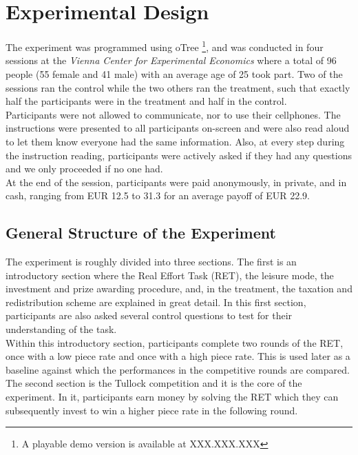     \chapter{Experimental Design}
    \label{ch:experiment}
    \thispagestyle{fancy}
    
    The experiment was programmed using oTree \citep{chen2016}\footnote{A playable demo version is available at XXX.XXX.XXX}, and was conducted in four sessions at the \textit{Vienna Center for Experimental Economics} where a total of 96 people (55 female and 41 male) with an average age of 25 took part. Two of the sessions ran the control while the two others ran the treatment, such that exactly half the participants were in the treatment and half in the control.\\
    
    Participants were not allowed to communicate, nor to use their cellphones. The instructions were presented to all participants on-screen and were also read aloud to let them know everyone had the same information. Also, at every step during the instruction reading, participants were actively asked if they had any questions and we only proceeded if no one had.\\
    
    At the end of the session, participants were paid anonymously, in private, and in cash, ranging from EUR 12.5 to 31.3 for an average payoff of EUR 22.9.
    
    \section{General Structure of the Experiment}
    
    The experiment is roughly divided into three sections. The first is an introductory section where the Real Effort Task (RET), the leisure mode, the investment and prize awarding procedure, and, in the treatment, the taxation and redistribution scheme are explained in great detail. In this first section, participants are also asked several control questions to test for their understanding of the task.\\
    
    Within this introductory section, participants complete two rounds of the RET, once with a low piece rate and once with a high piece rate. This is used later as a baseline against which the performances in the competitive rounds are compared.\\
    
    The second section is the Tullock competition and it is the core of the experiment. In it, participants earn money by solving the RET which they can subsequently invest to win a higher piece rate in the following round.\\
    
